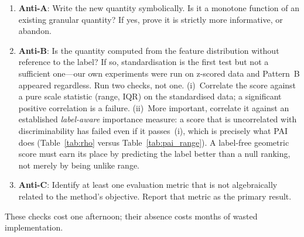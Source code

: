 \begin{enumerate}
\item \textbf{Anti-A}: Write the new quantity symbolically.  Is it a
monotone function of an existing granular quantity?  If yes, prove it is
strictly more informative, or abandon.
\item \textbf{Anti-B}: Is the quantity computed from the feature
distribution without reference to the label?  If so, standardisation is the
first test but not a sufficient one---our own experiments were run on
z-scored data and Pattern~B appeared regardless.  Run two checks, not one.
(i)~Correlate the score against a pure scale statistic (range, IQR) on the
standardised data; a significant positive correlation is a failure.
(ii)~More important, correlate it against an established
\emph{label-aware} importance measure: a score that is uncorrelated with
discriminability has failed even if it passes~(i), which is precisely what
PAI does (Table~\ref{tab:rho} versus Table~\ref{tab:pai_range}).  A
label-free geometric score must earn its place by predicting the label
better than a null ranking, not merely by being unlike range.
\item \textbf{Anti-C}: Identify at least one evaluation metric that is
not algebraically related to the method's objective.  Report that
metric as the primary result.
\end{enumerate}

These checks cost one afternoon; their absence costs months of wasted
implementation.
